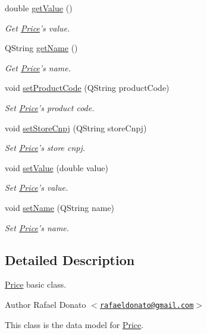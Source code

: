 \begin{DoxyCompactItemize}
double \hyperlink{class_price_abc26004bfc234f2f781a1bb406c5cf9c}{get\-Value} ()
\begin{DoxyCompactList}\small\item\em \-Get \hyperlink{class_price}{\-Price}'s value. \end{DoxyCompactList}\item 
\-Q\-String \hyperlink{class_price_ac5db230f1ca5ac6f4bae2934db69660c}{get\-Name} ()
\begin{DoxyCompactList}\small\item\em \-Get \hyperlink{class_price}{\-Price}'s name. \end{DoxyCompactList}\item 
void \hyperlink{class_price_af5012c6a260a854330cd13753f5a03e5}{set\-Product\-Code} (\-Q\-String product\-Code)
\begin{DoxyCompactList}\small\item\em \-Set \hyperlink{class_price}{\-Price}'s product code. \end{DoxyCompactList}\item 
void \hyperlink{class_price_aa1ae5763de31741300ffdba3fafc3fe0}{set\-Store\-Cnpj} (\-Q\-String store\-Cnpj)
\begin{DoxyCompactList}\small\item\em \-Set \hyperlink{class_price}{\-Price}'s store cnpj. \end{DoxyCompactList}\item 
void \hyperlink{class_price_ade3ed4075ca2e022d6aaaec46ac30a28}{set\-Value} (double value)
\begin{DoxyCompactList}\small\item\em \-Set \hyperlink{class_price}{\-Price}'s value. \end{DoxyCompactList}\item 
void \hyperlink{class_price_a34862d5e3b8c9d4082fe838f5a8f6501}{set\-Name} (\-Q\-String name)
\begin{DoxyCompactList}\small\item\em \-Set \hyperlink{class_price}{\-Price}'s name. \end{DoxyCompactList}\end{DoxyCompactItemize}


\subsection{\-Detailed \-Description}
\hyperlink{class_price}{\-Price} basic class. 

\begin{DoxyAuthor}{\-Author}
\-Rafael \-Donato $<$\href{mailto:rafaeldonato@gmail.com}{\tt rafaeldonato@gmail.\-com}$>$
\end{DoxyAuthor}
\-This class is the data model for \hyperlink{class_price}{\-Price}. 

